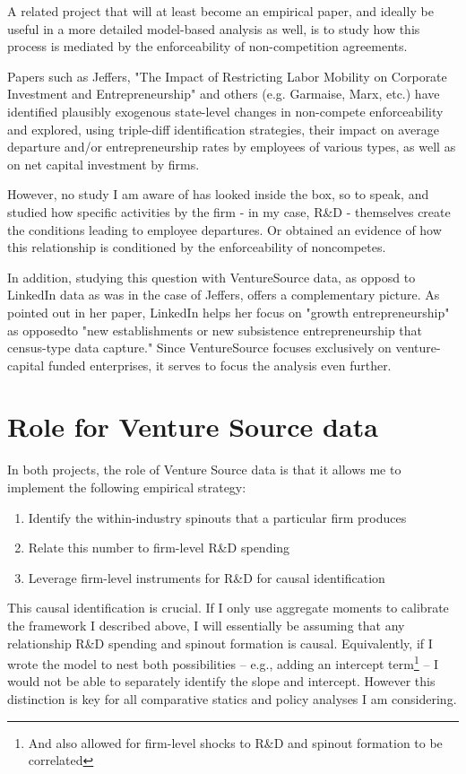\documentclass[12pt,english]{article}
\theoremstyle{remark}
\begin{document}
A related project that will at least become an empirical paper, and ideally be useful in a more detailed model-based analysis as well, is to study how this process is mediated by the enforceability of non-competition agreements. 

Papers such as Jeffers, "The Impact of Restricting Labor Mobility on Corporate Investment and Entrepreneurship" and others (e.g. Garmaise, Marx, etc.) have identified plausibly exogenous state-level changes in non-compete enforceability and explored, using triple-diff identification strategies, their impact on average departure and/or entrepreneurship rates by employees of various types, as well as on net capital investment by firms. 

However, no study I am aware of has looked inside the box, so to speak, and studied how specific activities by the firm - in my case, R\&D - themselves create the conditions leading to employee departures. Or obtained an evidence of how this relationship is conditioned by the enforceability of noncompetes. 

In addition, studying this question with VentureSource data, as opposd to LinkedIn data as was in the case of Jeffers, offers a complementary picture. As pointed out in her paper, LinkedIn helps her focus on "growth entrepreneurship" as opposedto "new establishments or new subsistence entrepreneurship that census-type data capture." Since VentureSource focuses exclusively on venture-capital funded enterprises, it serves to focus the analysis even further. 


\section{Role for Venture Source data}

In both projects, the role of Venture Source data is that it allows me to implement the following empirical strategy: 

\begin{enumerate}
	\item Identify the within-industry spinouts that a particular firm produces
	\item Relate this number to firm-level R\&D spending
	\item Leverage firm-level instruments for R\&D for causal identification
\end{enumerate}

This causal identification is crucial. If I only use aggregate moments to calibrate the framework I described above, I will essentially be assuming that any relationship R\&D spending and spinout formation is causal. Equivalently, if I wrote the model to nest both possibilities -- e.g., adding an intercept term\footnote{And also allowed for firm-level shocks to R\&D and spinout formation to be correlated}  -- I would not be able to separately identify the slope and intercept. However this distinction is key for all comparative statics and policy analyses I am considering. 
\end{document}

